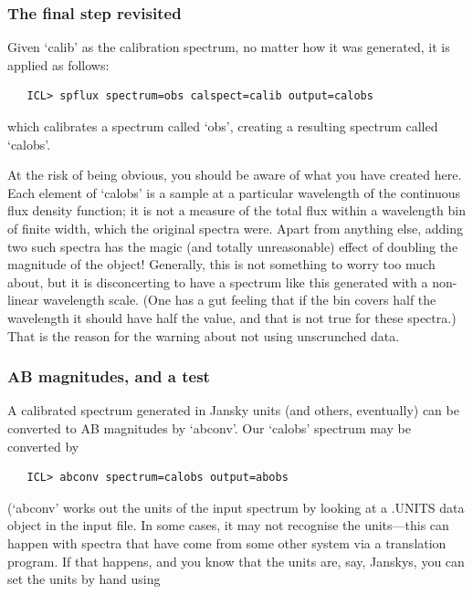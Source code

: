 \documentclass[11pt,twoside]{article}
\newcommand{\latorhtm}[2]{#1}
\newcommand{\latorhtm}[2]{#2}
\begin{document}

\subsubsection{\label{techno5final2}The final step revisited}

   Given `calib' as the calibration spectrum, no matter how it was
   generated, it is applied as follows:

\begin{verbatim}
   ICL> spflux spectrum=obs calspect=calib output=calobs
\end{verbatim}

   which calibrates a spectrum called `obs', creating a resulting
   spectrum called `calobs'.

   At the risk of being obvious, you should be aware of what you have
   created here.  Each element of `calobs' is a sample at a particular
   wavelength of the continuous flux density function; it is not a
   measure of the total flux within a wavelength bin of finite width,
   which the original spectra were.  Apart from anything else, adding
   two such spectra has the magic (and totally unreasonable) effect of
   doubling the magnitude of the object! Generally, this is not
   something to worry too much about, but it is disconcerting to have a
   spectrum like this generated with a non-linear wavelength scale. (One
   has a gut feeling that if the bin covers half the wavelength it
   should have half the value, and that is not true for these spectra.)
   That is the reason for the warning about not using unscrunched data.


\subsubsection{\label{techno5abmag}AB magnitudes, and a test}

   A calibrated spectrum generated in Jansky units (and others,
   eventually) can be converted to AB magnitudes by `abconv'.  Our
   `calobs' spectrum may be converted by

\begin{verbatim}
   ICL> abconv spectrum=calobs output=abobs
\end{verbatim}

   (`abconv' works out the units of the input spectrum by looking at a
   .UNITS data object in the input file.  In some cases, it may not
   recognise the units\latorhtm{---}{-}this can happen with spectra that
   have come
   from some other system via a translation program.  If that happens,
   and you know that the units are, say, Janskys, you can set the units
   by hand using
\end{document}
